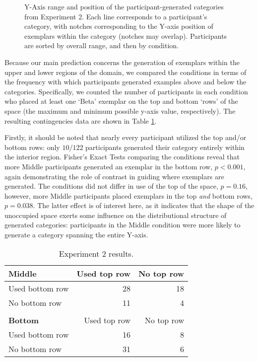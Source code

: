 \documentclass[12pt]{article}
\newcommand\inputpgf[2]{{
\let\pgfimageWithoutPath\pgfimage
\renewcommand{\pgfimage}[2][]{\pgfimageWithoutPath[##1]{#1/##2}}

}}
\begin{document}
\begin{flushleft}
\begin{figure}
    \begin{center}
    \inputpgf{figs/}{e2-yranges.pgf}
    \caption{Y-Axis range and position of the participant-generated categories from Experiment 2. Each line corresponds to a participant's category, with notches corresponding to the Y-axis position of exemplars within the category (notches may overlap). Participants are sorted by overall range, and then by condition. }
    \label{fig:e2-yranges}
    \end{center}
\end{figure}

Because our main prediction concerns the generation of exemplars within the upper and lower regions of the domain, we compared the conditions in terms of the frequency with which participants generated examples above and below the categories. Specifically, we counted the number of participants in each condition who placed at least one `Beta' exemplar on the top and bottom `rows' of the space (the maximum and minimum possible y-axis value, respectively). The resulting contingencies data are shown in Table \ref{table:e2-subset-table}. 

Firstly, it should be noted that nearly every participant utilized the top and/or bottom rows: only $10 / 122$ participants generated their category entirely within the interior region. Fisher's Exact Tests comparing the conditions reveal that more Middle participants generated an exemplar in the bottom row, $p < 0.001$, again demonstrating the role of contrast in guiding where exemplars are generated. The conditions did not differ in use of the top of the space, $p = 0.16$, however, more Middle participants placed exemplars in the top {\em and} bottom rows, $p = 0.038$. The latter effect is of interest here, as it indicates that the shape of the unoccupied space exerts some influence on the distributional structure of generated categories: participants in the Middle condition were more likely to generate a category spanning the entire Y-axis.

\begin{table}
\begin{center} 
\caption{Experiment 2 results.} 
\label{table:e2-subset-table} 
\vskip 0.12in
\begin{tabular}{ l r r}
    \textbf{Middle}         & Used top row & No top row \\
    \hline
    Used bottom row       &  28 & 18  \\
    No bottom row          &  11 &  4  \\
    \\
    \textbf{Bottom}         & Used top row & No top row \\
    \hline
    Used bottom row        & 16 & 8 \\
    No bottom row          & 31 & 6 \\
\end{tabular}
\end{center} 
\end{table}


\end{flushleft}
\end{document}

